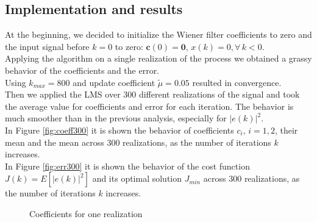 \documentclass[a4paper, 12pt]{report}
\begin{document}
\subsection*{Implementation and results}
At the beginning, we decided to initialize the Wiener filter coefficients to zero and the input signal before $k=0$ to zero: $\mathbf{c}(0) = \mathbf{0}$, $x(k) = 0, \forall \, k<0$. \\
Applying the algorithm on a single realization of the process we obtained a grassy behavior of the coefficients and the error.\\
Using $k_{max} = 800$ and update coefficient $\tilde{\mu} = 0.05$ resulted in convergence.\\
Then we applied the LMS over 300 different realizations of the signal and took the average value for coefficients and error for each iteration. The behavior is much smoother than in the previous analysis, especially for $|e(k)|^2$.\\
In Figure \ref{fig:coeff300} it is shown the behavior of coefficients $c_i, \, i=1,2$, their mean and the mean across 300 realizations, as the number of iterations $k$ increases.\\
In Figure \ref{fig:err300} it is shown the behavior of the cost function $J(k) = E \left[ |e(k)|^2 \right]$ and its optimal solution $J_{min}$ across 300 realizations, as the number of iterations $k$ increases.

\begin{figure}[h!]
	\centering
	\caption{Coefficients for one realization}
	
\end{figure}
\end{document}
